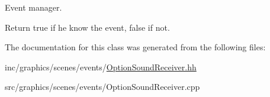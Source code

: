 Event manager. 

Return true if he know the event, false if not. 

The documentation for this class was generated from the following files\+:\begin{DoxyCompactItemize}
\item 
inc/graphics/scenes/events/\hyperlink{OptionSoundReceiver_8hh}{Option\+Sound\+Receiver.\+hh}\item 
src/graphics/scenes/events/Option\+Sound\+Receiver.\+cpp\end{DoxyCompactItemize}

